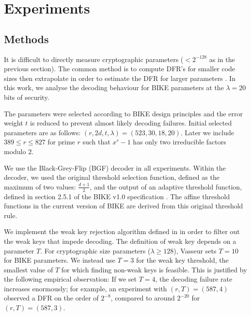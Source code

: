 \chapter{Experiments}

\section{Methods}

It is difficult to directly measure cryptographic parameters ($< 2^{-128}$ as in the previous section). The common method is to compute DFR's for smaller code sizes then extrapolate in order to estimate the DFR for larger parameters \cite{SV19,DGK20a,DGK20b}. In this work, we analyse the decoding behaviour for BIKE parameters at the $\lambda = 20$ bits of security. 

The parameters were selected according to BIKE design principles and the error weight $t$ is reduced to prevent almost likely decoding failures. Initial selected parameters are as follows: $(r,2d,t,\lambda) = (523,30,18,20)$. Later we include $389 \le r \le 827$ for prime $r$ such that $x^r - 1$ has only two irreducible factors modulo $2$.

We use the Black-Grey-Flip (BGF) decoder in all experiments. Within the decoder, we used the original threshold selection function, defined as the maximum of two values: $\frac{d+1}{2}$, and the output of an adaptive threshold function, defined in section 2.5.1 of the BIKE v1.0 specification \cite{BIKE2017}. The affine threshold functions in the current version of BIKE are derived from this original threshold rule.

We implement the weak key rejection algorithm defined in \cite[Algorithm 15.3]{Vasseur-thesis} in order to filter out the weak keys that impede decoding. The definition of weak key depends on a parameter $T$. For cryptographic size parameters ($\lambda \geq 128$), Vasseur sets $T=10$ for BIKE parameters. We instead use $T = 3$ for the weak key threshold, the smallest value of $T$ for which finding non-weak keys is feasible. This is justified by the following empirical observation: If we set $T = 4$, the decoding failure rate increases enormously; for example, an experiment with $(r, T) = (587, 4)$ observed a DFR on the order of $2^{-8}$, compared to around $2^{-20}$ for $(r, T) = (587, 3)$.


